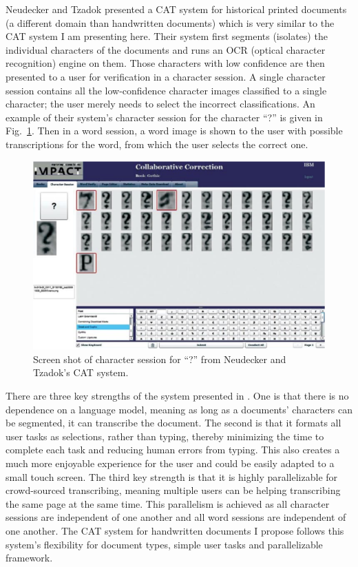 \documentclass[conference]{IEEEtran}
\begin{document}
{Neudecker and Tzadok\cite{Neudecker2010} presented a CAT system for historical printed documents (a different domain than handwritten documents) which is very similar to the CAT system I am presenting here. Their system first segments (isolates) the individual characters of the documents and runs an OCR (optical character recognition) engine on them. Those characters with low confidence are then presented to a user for verification in a character session. A single character session contains all the low-confidence character images classified to a single character; the user merely needs to select the incorrect classifications.
An example of their system's character session for the character ``?'' is given in Fig.~\ref{fig:carpet}. 
Then in a word session, a word image is shown to the user with possible transcriptions for the word, from which the user selects the correct one.

\begin{figure}
    \centering
    \includegraphics[width=.4\textwidth]{carpet}
    \caption{Screen shot of character session for ``?'' from Neudecker and Tzadok's\cite{Neudecker2010} CAT system.}
    \label{fig:carpet}
\end{figure}

There are three key strengths of the system presented in \cite{Neudecker2010}. One is that there is no dependence on a language model, meaning as long as a documents' characters can be segmented, it can transcribe the document. The second is that it formats all user tasks as selections, rather than typing, thereby minimizing the time to complete each task and reducing human errors from typing. This also creates a much more enjoyable experience for the user and could be easily adapted to a small touch screen. The third key strength is that it is highly parallelizable for crowd-sourced transcribing, meaning multiple users can be helping transcribing the same page at the same time. This parallelism is achieved as all character sessions are independent of one another and all word sessions are independent of one another. The CAT system for handwritten documents I propose follows this system's flexibility for document types, simple user tasks and parallelizable framework.


}
\end{document}
